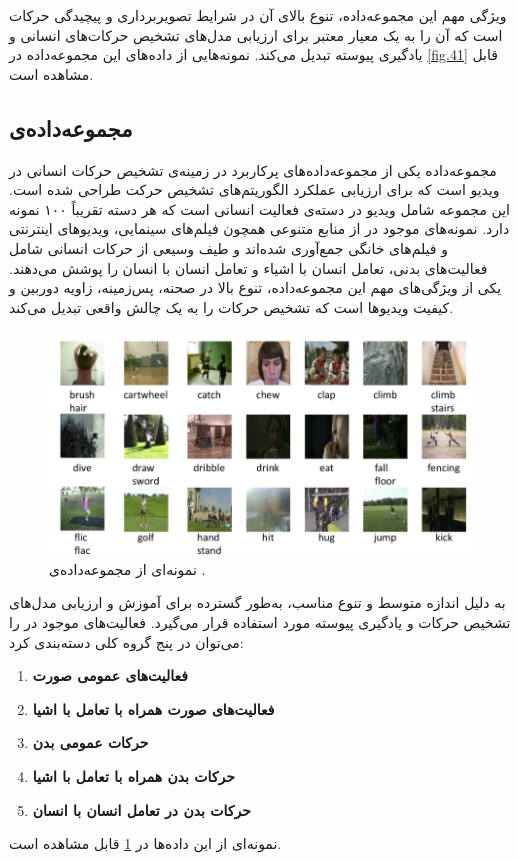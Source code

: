 ویژگی مهم این مجموعه‌داده، تنوع بالای آن در شرایط تصویربرداری و پیچیدگی حرکات است 
که آن را به یک معیار معتبر برای ارزیابی مدل‌های تشخیص حرکات‌های انسانی و یادگیری پیوسته تبدیل می‌کند. نمونه‌هایی از داده‌های این مجموعه‌داده در \cref{fig.41} قابل مشاهده است. 
‌\subsection{مجموعه‌داده‌ی }
مجموعه‌داده  \cite{hmdb51} یکی از مجموعه‌داده‌های پرکاربرد در زمینه‌ی تشخیص حرکات انسانی در ویدیو است که برای ارزیابی عملکرد الگوریتم‌های تشخیص حرکت طراحی شده است. 
این مجموعه شامل  ویدیو در  دسته‌ی فعالیت انسانی است که هر دسته تقریباً ۱۰۰ نمونه دارد. 
نمونه‌های موجود در  از منابع متنوعی همچون فیلم‌های سینمایی، ویدیو‌های اینترنتی و فیلم‌های خانگی جمع‌آوری شده‌اند 
و طیف وسیعی از حرکات انسانی شامل فعالیت‌های بدنی، تعامل انسان با اشیاء و تعامل انسان با انسان را پوشش می‌دهند. یکی از ویژگی‌های مهم این مجموعه‌داده، تنوع بالا در صحنه، پس‌زمینه، زاویه دوربین و کیفیت ویدیوها است 
که تشخیص حرکات را به یک چالش واقعی تبدیل می‌کند. 
\begin{figure}
	\centering\includegraphics[scale=.6]{Images/Chapter4/HMDB_snapshot1-300x225.png}
	\caption[نمونه‌ای از مجموعه‌داده‌ی ]{ نمونه‌ای از مجموعه‌داده‌ی \cite{hmdb51}.}
	\label{fig.42}
\end{figure}
به دلیل اندازه متوسط و تنوع مناسب،  به‌طور گسترده برای آموزش و ارزیابی مدل‌های تشخیص حرکات و یادگیری پیوسته مورد استفاده قرار می‌گیرد. فعالیت‌های موجود در  را می‌توان در پنج گروه کلی دسته‌بندی کرد:
\begin{enumerate}
	\item \textbf{فعالیت‌های عمومی صورت}
	\item \textbf{فعالیت‌های صورت همراه با تعامل با اشیا} 
	\item \textbf{حرکات عمومی بدن} 
	\item \textbf{حرکات بدن همراه با تعامل با اشیا} 
	\item \textbf{حرکات بدن در تعامل انسان با انسان} 
\end{enumerate}
نمونه‌ای از این داده‌ها در \cref{fig.42} قابل مشاهده است.
